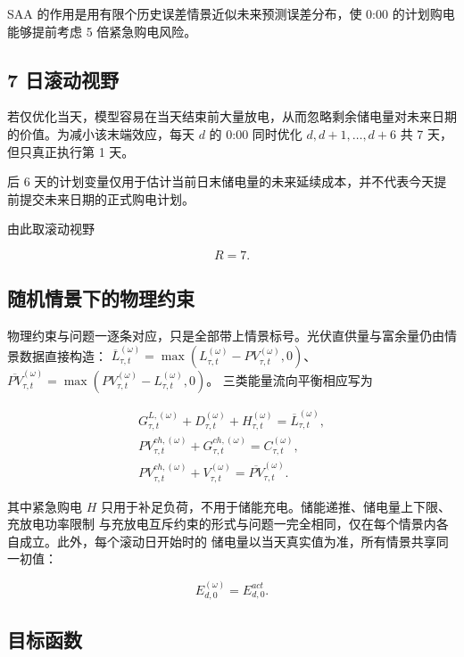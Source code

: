 SAA 的作用是用有限个历史误差情景近似未来预测误差分布，使 0:00 的计划购电能够提前考虑 5 倍紧急购电风险。

\subsection{7 日滚动视野}

若仅优化当天，模型容易在当天结束前大量放电，从而忽略剩余储电量对未来日期的价值。为减小该末端效应，每天 \(d\) 的 0:00 同时优化 \(d,d+1,\ldots,d+6\) 共 7 天，但只真正执行第 1 天。

后 6 天的计划变量仅用于估计当前日末储电量的未来延续成本，并不代表今天提前提交未来日期的正式购电计划。

由此取滚动视野

\[
R=7.
\]

\subsection{随机情景下的物理约束}

物理约束与问题一逐条对应，只是全部带上情景标号。光伏直供量与富余量仍由情景数据直接构造：
\(\overline L^{(\omega)}_{\tau,t}=\max(L^{(\omega)}_{\tau,t}-PV^{(\omega)}_{\tau,t},0)\)、
\(\overline{PV}^{(\omega)}_{\tau,t}=\max(PV^{(\omega)}_{\tau,t}-L^{(\omega)}_{\tau,t},0)\)。
三类能量流向平衡相应写为

\begin{equation}
\begin{gathered}
G^{L,(\omega)}_{\tau,t}+D^{(\omega)}_{\tau,t}+H^{(\omega)}_{\tau,t}=\overline L^{(\omega)}_{\tau,t},\\
PV^{ch,(\omega)}_{\tau,t}+G^{ch,(\omega)}_{\tau,t}=C^{(\omega)}_{\tau,t},\\
PV^{ch,(\omega)}_{\tau,t}+V^{(\omega)}_{\tau,t}=\overline{PV}^{(\omega)}_{\tau,t}.
\end{gathered}
\end{equation}

其中紧急购电 \(H\) 只用于补足负荷，不用于储能充电。储能递推、储电量上下限、充放电功率限制
与充放电互斥约束的形式与问题一完全相同，仅在每个情景内各自成立。此外，每个滚动日开始时的
储电量以当天真实值为准，所有情景共享同一初值：

\begin{equation}
E^{(\omega)}_{d,0}=E^{act}_{d,0}.
\end{equation}

\subsection{目标函数}

